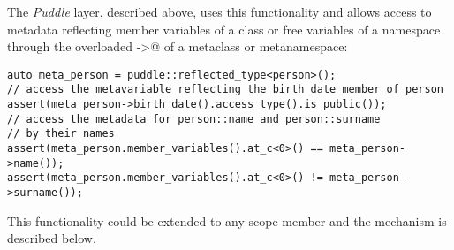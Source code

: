 The {\em Puddle} layer, described above, uses this functionality and allows
access to metadata reflecting member variables of a class or free variables
of a namespace through the overloaded \verb@operator ->@ of a metaclass
or metanamespace:

\begin{lstlisting}
auto meta_person = puddle::reflected_type<person>();
// access the metavariable reflecting the birth_date member of person
assert(meta_person->birth_date().access_type().is_public());
// access the metadata for person::name and person::surname
// by their names
assert(meta_person.member_variables().at_c<0>() == meta_person->name());
assert(meta_person.member_variables().at_c<0>() != meta_person->surname());

\end{lstlisting}

This functionality could be extended to any scope member and
the mechanism is described below.


